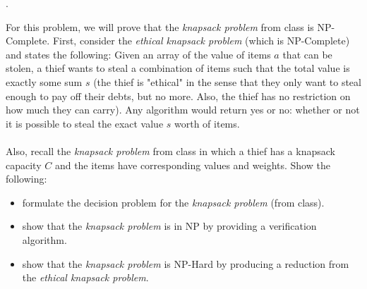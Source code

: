 \documentclass[12pt]{article}
\newcounter{quesnum}
\newcommand{\question}[2][??]{
\begin{list}{\labelitemi}{\leftmargin=2em}
\item [\arabic{quesnum}.] {#2}
\end{list}
\addtocounter{quesnum}{1}
}
\newcommand{\answer}[2][??]{ 
\ifthenelse{\boolean{solution}}{
\color{red} #2 \color{black}}
{\vspace*{#1}}
}
\begin{document}
\answer[0 in]{
...
}


\question[3]{
For this problem, we will prove that the \emph{knapsack problem} from class is NP-Complete. First, consider the \emph{ethical knapsack problem} (which is NP-Complete) and states the following: Given an array of the value of items $a$ that can be stolen, a thief wants to steal a combination of items such that the total value is exactly some sum $s$ (the thief is "ethical" in the sense that they only want to steal enough to pay off their debts, but no more. Also, the thief has no restriction on how much they can carry). Any algorithm would return yes or no: whether or not it is possible to steal the exact value $s$ worth of items.\\
\\
Also, recall the \emph{knapsack problem} from class in which a thief has a knapsack capacity $C$ and the items have corresponding values and weights. Show the following:

\begin{itemize}
\item formulate the decision problem for the \emph{knapsack problem} (from class).
\item show that the \emph{knapsack problem} is in NP by providing a verification algorithm.
\item show that the \emph{knapsack problem} is NP-Hard by producing a reduction from the \emph{ethical knapsack problem}.
\end{itemize}
}


\end{document}
